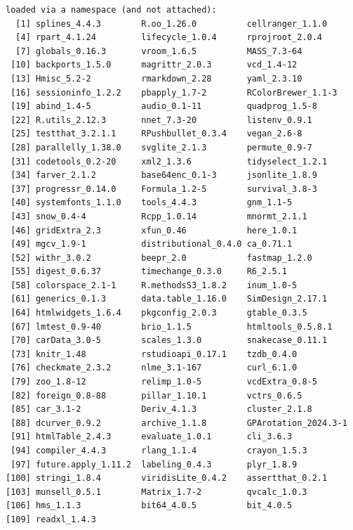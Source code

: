 \documentclass[
  letterpaper,
  DIV=11,
  numbers=noendperiod]{scrartcl}
\begin{document}
\begin{verbatim}
loaded via a namespace (and not attached):
  [1] splines_4.4.3        R.oo_1.26.0          cellranger_1.1.0    
  [4] rpart_4.1.24         lifecycle_1.0.4      rprojroot_2.0.4     
  [7] globals_0.16.3       vroom_1.6.5          MASS_7.3-64         
 [10] backports_1.5.0      magrittr_2.0.3       vcd_1.4-12          
 [13] Hmisc_5.2-2          rmarkdown_2.28       yaml_2.3.10         
 [16] sessioninfo_1.2.2    pbapply_1.7-2        RColorBrewer_1.1-3  
 [19] abind_1.4-5          audio_0.1-11         quadprog_1.5-8      
 [22] R.utils_2.12.3       nnet_7.3-20          listenv_0.9.1       
 [25] testthat_3.2.1.1     RPushbullet_0.3.4    vegan_2.6-8         
 [28] parallelly_1.38.0    svglite_2.1.3        permute_0.9-7       
 [31] codetools_0.2-20     xml2_1.3.6           tidyselect_1.2.1    
 [34] farver_2.1.2         base64enc_0.1-3      jsonlite_1.8.9      
 [37] progressr_0.14.0     Formula_1.2-5        survival_3.8-3      
 [40] systemfonts_1.1.0    tools_4.4.3          gnm_1.1-5           
 [43] snow_0.4-4           Rcpp_1.0.14          mnormt_2.1.1        
 [46] gridExtra_2.3        xfun_0.46            here_1.0.1          
 [49] mgcv_1.9-1           distributional_0.4.0 ca_0.71.1           
 [52] withr_3.0.2          beepr_2.0            fastmap_1.2.0       
 [55] digest_0.6.37        timechange_0.3.0     R6_2.5.1            
 [58] colorspace_2.1-1     R.methodsS3_1.8.2    inum_1.0-5          
 [61] generics_0.1.3       data.table_1.16.0    SimDesign_2.17.1    
 [64] htmlwidgets_1.6.4    pkgconfig_2.0.3      gtable_0.3.5        
 [67] lmtest_0.9-40        brio_1.1.5           htmltools_0.5.8.1   
 [70] carData_3.0-5        scales_1.3.0         snakecase_0.11.1    
 [73] knitr_1.48           rstudioapi_0.17.1    tzdb_0.4.0          
 [76] checkmate_2.3.2      nlme_3.1-167         curl_6.1.0          
 [79] zoo_1.8-12           relimp_1.0-5         vcdExtra_0.8-5      
 [82] foreign_0.8-88       pillar_1.10.1        vctrs_0.6.5         
 [85] car_3.1-2            Deriv_4.1.3          cluster_2.1.8       
 [88] dcurver_0.9.2        archive_1.1.8        GPArotation_2024.3-1
 [91] htmlTable_2.4.3      evaluate_1.0.1       cli_3.6.3           
 [94] compiler_4.4.3       rlang_1.1.4          crayon_1.5.3        
 [97] future.apply_1.11.2  labeling_0.4.3       plyr_1.8.9          
[100] stringi_1.8.4        viridisLite_0.4.2    assertthat_0.2.1    
[103] munsell_0.5.1        Matrix_1.7-2         qvcalc_1.0.3        
[106] hms_1.1.3            bit64_4.0.5          bit_4.0.5           
[109] readxl_1.4.3        
\end{verbatim}
\end{document}
